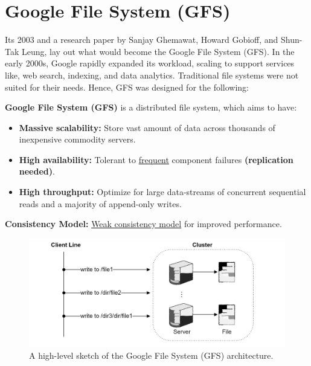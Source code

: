 \newpage 
\section{Google File System (GFS)}

Its 2003 and a research paper by Sanjay Ghemawat, Howard Gobioff, and Shun-Tak Leung, lay out
what would become the Google File System (GFS). In the early 2000s,
Google rapidly expanded its workload, scaling to support services like,
web search, indexing, and data analytics. Traditional file 
systems were not suited for their needs. Hence, GFS was designed for the following:

\begin{Def}
  
  \textbf{Google File System (GFS)} is a distributed file system, which aims to have:
  \begin{itemize}
    \item \textbf{Massive scalability:} Store vast amount of data across thousands of inexpensive commodity servers.
    \item \textbf{High availability:} Tolerant to \underline{frequent} component failures \textbf{(replication needed)}.
    \item \textbf{High throughput:} Optimize for large data-streams of concurrent sequential reads and a majority of append-only writes.
  \end{itemize}

  \noindent
  \textbf{Consistency Model:} \underline{Weak consistency model} for improved performance.
\end{Def}

\vspace{1em}
\begin{figure}[h]
  \centering
  \includegraphics[width=\textwidth]{Sections/gfs/gfs.png}
  \caption{A high-level sketch of the Google File System (GFS) architecture.}
  \label{fig:gfs-architecture}

\end{figure}

